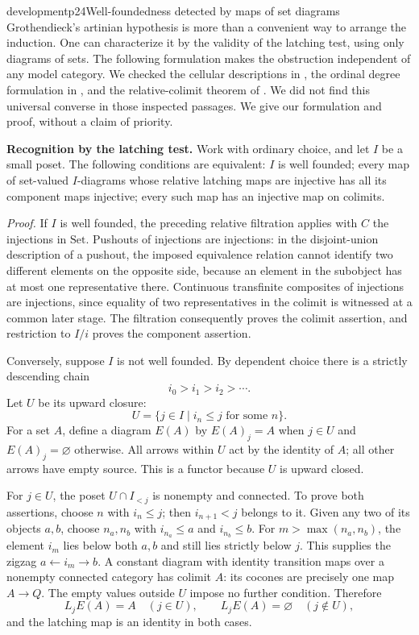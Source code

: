 \begin{dcomment}{development}{p24}{Well-foundedness detected by maps of set diagrams}
Grothendieck's artinian hypothesis is more than a convenient way to arrange the induction. One can characterize it by the validity of the latching test, using only diagrams of sets. The following formulation makes the obstruction independent of any model category. We checked the cellular descriptions in \citet[Proposition~6.3 and Corollary~6.8]{RiehlVerity2014Reedy}, the ordinal degree formulation in \citet[Section~4]{Shulman2015Reedy}, and the relative-colimit theorem of \citet[Section~9.4]{RadulescuBanu2009}. We did not find this universal converse in those inspected passages. We give our formulation and proof, without a claim of priority.

\textbf{Recognition by the latching test.}\ours\quad
Work with ordinary choice, and let $I$ be a small poset. The following conditions are equivalent: $I$ is well founded; every map of set-valued $I$-diagrams whose relative latching maps are injective has all its component maps injective; every such map has an injective map on colimits.

\emph{Proof.} If $I$ is well founded, the preceding relative filtration applies with $C$ the injections in $\mathrm{Set}$. Pushouts of injections are injections: in the disjoint-union description of a pushout, the imposed equivalence relation cannot identify two different elements on the opposite side, because an element in the subobject has at most one representative there. Continuous transfinite composites of injections are injections, since equality of two representatives in the colimit is witnessed at a common later stage. The filtration consequently proves the colimit assertion, and restriction to $I/i$ proves the component assertion.

Conversely, suppose $I$ is not well founded. By dependent choice there is a strictly descending chain
\[
 i_0>i_1>i_2>\cdots.
\]
Let $U$ be its upward closure:
\[
 U=\{j\in I\mid i_n\leq j\text{ for some }n\}.
\]
For a set $A$, define a diagram $E(A)$ by $E(A)_j=A$ when $j\in U$ and $E(A)_j=\varnothing$ otherwise. All arrows within $U$ act by the identity of $A$; all other arrows have empty source. This is a functor because $U$ is upward closed.

For $j\in U$, the poset $U\cap I_{<j}$ is nonempty and connected. To prove both assertions, choose $n$ with $i_n\leq j$; then $i_{n+1}<j$ belongs to it. Given any two of its objects $a,b$, choose $n_a,n_b$ with $i_{n_a}\leq a$ and $i_{n_b}\leq b$. For $m>\max(n_a,n_b)$, the element $i_m$ lies below both $a,b$ and still lies strictly below $j$. This supplies the zigzag $a\leftarrow i_m\to b$. A constant diagram with identity transition maps over a nonempty connected category has colimit $A$: its cocones are precisely one map $A\to Q$. The empty values outside $U$ impose no further condition. Therefore
\[
 L_jE(A)=A\quad(j\in U),
 \qquad L_jE(A)=\varnothing\quad(j\notin U),
\]
and the latching map is an identity in both cases.


\end{dcomment}
